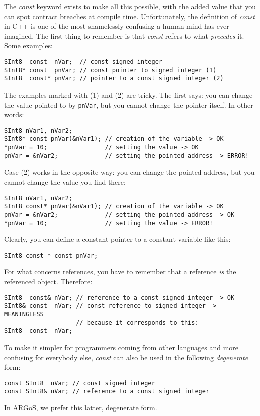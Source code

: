 \documentclass[a4paper]{article}
\newcommand{\argos}{ARGoS\xspace}
\begin{document}
The {\it const} keyword exists to make all this possible, with the
added value that you can spot contract breaches at compile
time. Unfortunately, the definition of {\it const} in C++ is one of
the most shamelessly confusing a human mind has ever imagined. The
first thing to remember is that {\it const} refers to what {\it
precedes} it. Some examples:
%
\begin{lstlisting}
SInt8  const  nVar;  // const signed integer
SInt8* const  pnVar; // const pointer to signed integer (1)
SInt8  const* pnVar; // pointer to a const signed integer (2)
\end{lstlisting}
%
The examples marked with (1) and (2) are tricky. The first says: you
can change the value pointed to by \lstinline!pnVar!, but you cannot
change the pointer itself. In other words:
%
\begin{lstlisting}
SInt8 nVar1, nVar2;
SInt8* const pnVar(&nVar1); // creation of the variable -> OK
*pnVar = 10;                // setting the value -> OK
pnVar = &nVar2;             // setting the pointed address -> ERROR!
\end{lstlisting}
%
Case (2) works in the opposite way: you can change the pointed address,
but you cannot change the value you find there:
%
\begin{lstlisting}
SInt8 nVar1, nVar2;
SInt8 const* pnVar(&nVar1); // creation of the variable -> OK
pnVar = &nVar2;             // setting the pointed address -> OK
*pnVar = 10;                // setting the value -> ERROR!
\end{lstlisting}
%
Clearly, you can define a constant pointer to a constant variable like this:
%
\begin{lstlisting}
SInt8 const * const pnVar;
\end{lstlisting}
%
For what concerns references, you have to remember that a reference
{\it is} the referenced object. Therefore:
%
\begin{lstlisting}
SInt8  const& nVar; // reference to a const signed integer -> OK
SInt8& const  nVar; // const reference to signed integer -> MEANINGLESS
                    // because it corresponds to this:
SInt8  const  nVar; 
\end{lstlisting}
%
To make it simpler for programmers coming from other languages and
more confusing for everybody else, {\it const} can also be used in the
following {\it degenerate} form:
%
\begin{lstlisting}
const SInt8  nVar; // const signed integer
const SInt8& nVar; // reference to a const signed integer
\end{lstlisting}
%
In \argos, we prefer this latter, degenerate form.
\end{document}
